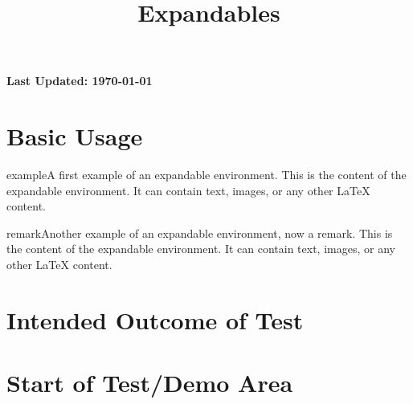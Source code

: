 \documentclass{ximera}
\title{Expandables}
\begin{document}
\begin{abstract}
\end{abstract}
\maketitle

{{\Huge \bfseries Last Updated: \today}} \\

\section{Basic Usage}

\begin{expandable}{example}{A first example of an expandable environment.}
This is the content of the expandable environment. It can contain text, images, or any other LaTeX content.
\end{expandable}

\begin{expandable}{remark}{Another example of an expandable environment, now a remark.}
This is the content of the expandable environment. It can contain text, images, or any other LaTeX content.
\end{expandable}

\section{Intended Outcome of Test}

\section{Start of Test/Demo Area}

\hrulefill
\end{document}
